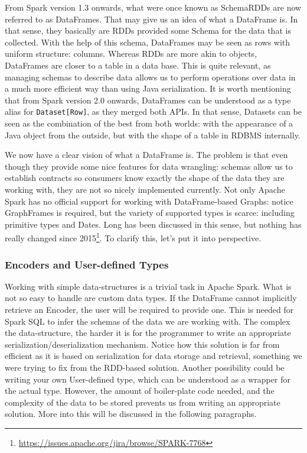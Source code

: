 From Spark version 1.3 onwards, what were once known as SchemaRDDs are now referred to as DataFrames. That may give us an idea of what a DataFrame is. In that sense, they basically are RDDs provided some Schema for the data that is collected. With the help of this schema, DataFrames may be seen as rows with uniform structure: columns. Whereas RDDs are more akin to objects, DataFrames are closer to a table in a data base. This is quite relevant, as managing schemas to describe data allows us to perform operations over data in a much more efficient way than using Java serialization. It is worth mentioning that from Spark version 2.0 onwards, DataFrames can be understood as a type alias for \texttt{Dataset[Row]}, as they merged both APIs. In that sense, Datasets can be seen as the combination of the best from both worlds: with the appearance of a Java object from the outside, but with the shape of a table in RDBMS internally.

We now have a clear vision of what a DataFrame is. The problem is that even though they provide some nice features for data wrangling: schemas allow us to establish contracts so consumers know exactly the shape of the data they are working with, they are not so nicely implemented currently. Not only Apache Spark has no official support for working with DataFrame-based Graphs: notice GraphFrames is required, but the variety of supported types is scarce: including primitive types and Dates. Long has been discussed in this sense, but nothing has really changed since 2015\footnote{\url{https://issues.apache.org/jira/browse/SPARK-7768}}. To clarify this, let's put it into perspective.

\subsubsection{Encoders and User-defined Types}

Working with simple data-structures is a trivial task in Apache Spark. What is not so easy to handle are custom data types. If the DataFrame cannot implicitly retrieve an Encoder, the user will be required to provide one. This is needed for Spark SQL to infer the schemas of the data we are working with. The complex the data-structure, the harder it is for the programmer to write an appropriate serialization/deserialization mechanism. Notice how this solution is far from efficient as it is based on serialization for data storage and retrieval, something we were trying to fix from the RDD-based solution. Another possibility could be writing your own User-defined type, which can be understood as a wrapper for the actual type. However, the amount of boiler-plate code needed, and the complexity of the data to be stored prevents us from writing an appropriate solution. More into this will be discussed in the following paragraphs.

